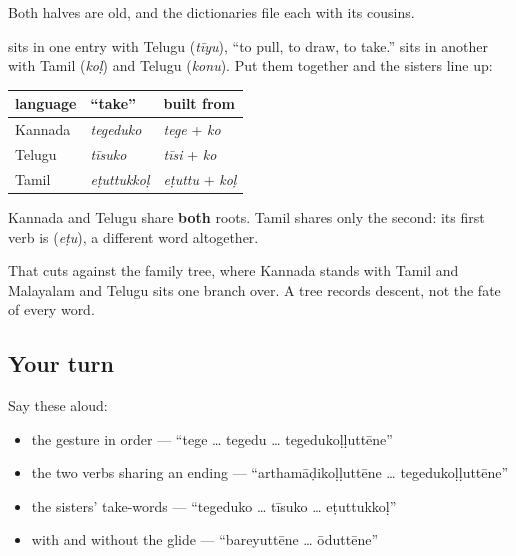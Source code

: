 \begin{cousinweb}
Both halves are old, and the dictionaries file each with its cousins.

\textbf{} sits in one entry with Telugu \textbf{} (\emph{tīyu}), \textquotedblleft{}to pull, to draw, to take.\textquotedblright{} \textbf{} sits in another with Tamil \textbf{} (\emph{koḷ}) and Telugu \textbf{} (\emph{konu}). Put them together and the sisters line up:

\noindent
\begin{tabularx}{\linewidth}{@{}>{\raggedright\arraybackslash}X>{\raggedright\arraybackslash}X>{\raggedright\arraybackslash}X@{}}
\toprule
\textbf{language} & \textbf{\textquotedblleft{}take\textquotedblright{}} & \textbf{built from} \\
\midrule
Kannada & \emph{tegeduko} & \emph{tege} + \emph{ko} \\
Telugu & \emph{tīsuko} & \emph{tīsi} + \emph{ko} \\
Tamil & \emph{eṭuttukkoḷ} & \emph{eṭuttu} + \emph{koḷ} \\
\bottomrule
\end{tabularx}

Kannada and Telugu share \textbf{both} roots. Tamil shares only the second: its first verb is \textbf{} (\emph{eṭu}), a different word altogether.

That cuts against the family tree, where Kannada stands with Tamil and Malayalam and Telugu sits one branch over. A tree records descent, not the fate of every word.
\end{cousinweb}

\subsection*{Your turn}
Say these aloud:

\begin{itemize}
\raggedright
  \item the gesture in order — \textquotedblleft{}tege … tegedu … tegedukoḷḷuttēne\textquotedblright{}
  \item the two verbs sharing an ending — \textquotedblleft{}arthamāḍikoḷḷuttēne … tegedukoḷḷuttēne\textquotedblright{}
  \item the sisters' take-words — \textquotedblleft{}tegeduko … tīsuko … eṭuttukkoḷ\textquotedblright{}
  \item with and without the glide — \textquotedblleft{}bareyuttēne … ōduttēne\textquotedblright{}
\end{itemize}

